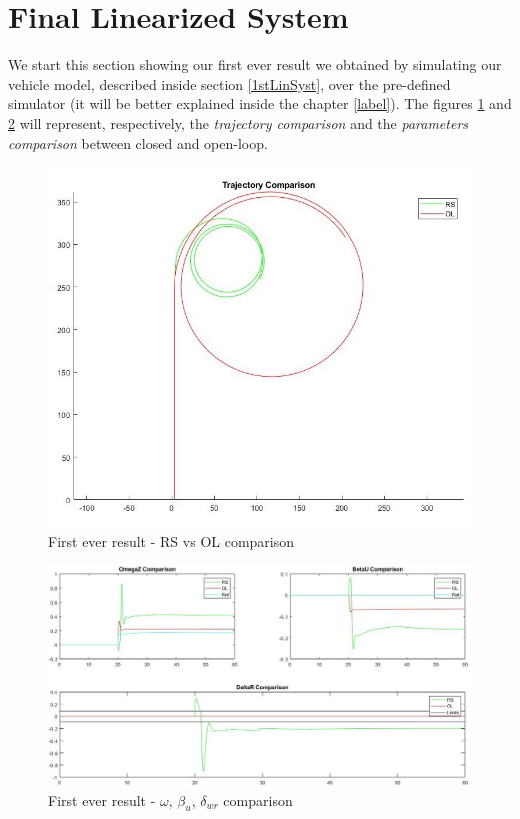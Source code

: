 \section{Final Linearized System} \label{Final LTI}
	We start this section showing our first ever result we obtained by simulating our vehicle model, described inside section \ref{1stLinSyst}, over the pre-defined simulator (it will be better explained inside the chapter \ref{label}). 
	The figures \ref{FR traj} and \ref{FR ref} will represent, respectively, the \textit{trajectory comparison} and the \textit{parameters comparison} between closed and open-loop.
\begin{figure}[!b]
	\centering
	\includegraphics[scale=0.5]{../Images/LinSyst/FakeRes-trj}
	\caption{First ever result - RS vs OL comparison}
	\label{FR traj}
\end{figure}
\begin{figure}
	\centering
	\includegraphics[scale=0.5]{../Images/LinSyst/FakeRes}
	\caption{First ever result - $\omega$, $\beta_{u}$, $\delta_{wr}$ comparison}
	\label{FR ref}
\end{figure}
	
